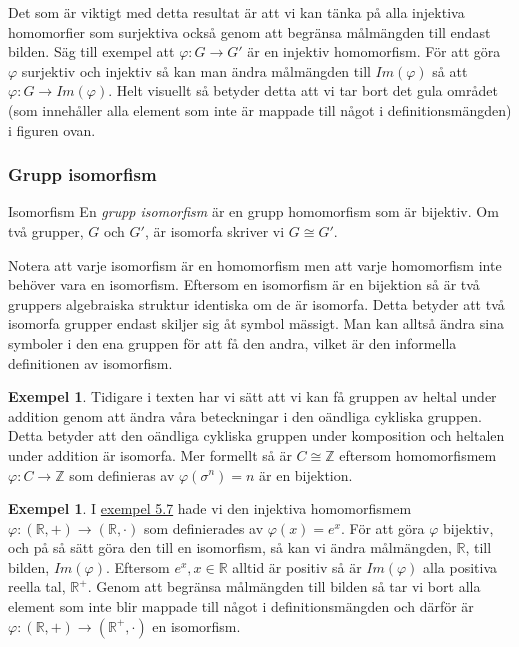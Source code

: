 \documentclass{article}
\theoremstyle{definition}
\newtheorem{exmp}[thm]{Exempel}
\begin{document}
Det som är viktigt med detta resultat är att vi kan tänka på alla injektiva homomorfier som
surjektiva också genom att begränsa målmängden till endast bilden. Säg till exempel att 
$\varphi : G \rightarrow G'$ är en injektiv homomorfism. För att göra $\varphi$ surjektiv och injektiv 
så kan man ändra målmängden till $Im(\varphi)$ så att $\varphi : G \rightarrow Im(\varphi)$.
Helt visuellt så betyder detta att vi tar bort det gula området 
(som innehåller alla element som inte är mappade till något i definitionsmängden) i figuren ovan.


\subsubsection{Grupp isomorfism}
\begin{mydef}{Isomorfism}{}
  En \textit{grupp isomorfism} är en grupp homomorfism som är bijektiv. 
  Om två grupper, $G$ och $G'$, är 
  isomorfa skriver vi $G \cong G'$.
\end{mydef}
Notera att varje isomorfism är en homomorfism men att
varje homomorfism inte behöver vara en isomorfism. 
Eftersom en isomorfism är en bijektion så är två gruppers algebraiska struktur identiska 
om de är isomorfa. Detta betyder att två isomorfa grupper endast skiljer sig åt symbol mässigt. 
Man kan alltså ändra sina symboler i den ena gruppen för att få den andra, vilket är den informella 
definitionen av isomorfism.


\begin{exmp}
Tidigare i texten har vi sätt att vi kan få gruppen av heltal under addition genom att 
ändra våra beteckningar i den oändliga cykliska gruppen. Detta betyder att 
den oändliga cykliska gruppen under komposition och heltalen under addition är isomorfa.
Mer formellt så är $C \cong \mathbb{Z}$ eftersom homomorfismem
$\varphi: C \rightarrow \mathbb{Z}$ 
som definieras av 
$\varphi (\sigma^n) = n$
är en bijektion.
\end{exmp}

\begin{exmp}
  I \hyperlink{exmp4.7}{exempel 5.7} hade vi den injektiva homomorfismem 
  $\varphi : (\mathbb{R}, +) \rightarrow (\mathbb{R}, \cdot)$ som definierades av 
  $\varphi(x) = e^x.$ För att göra $\varphi$ bijektiv, och på så sätt göra den till en isomorfism, 
  så kan 
  vi ändra målmängden, $\mathbb{R}$, till bilden, $Im(\varphi)$. Eftersom $e^x, x \in \mathbb{R}$
  alltid är positiv så är $Im(\varphi)$ alla positiva reella tal, $\mathbb{R}^+.$
  Genom att begränsa målmängden till bilden så tar vi bort alla element som inte blir 
  mappade till något i definitionsmängden och därför är 
  $\varphi : (\mathbb{R}, +) \rightarrow (\mathbb{R}^+, \cdot)$ en isomorfism. 
\end{exmp}
\end{document}
